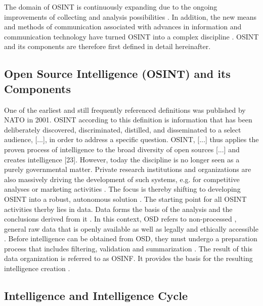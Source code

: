 \documentclass[10pt]{article}
\begin{document}
The domain of OSINT is continuously expanding due to the ongoing improvements of
collecting and analysis possibilities \cite{AlKilani.2021, Ghioni.2023, Williams.2018}. In
addition, the new means and methods of communication associated with advances in information
and communication technology have turned OSINT into a complex discipline
\cite{AlKilani.2021, Benes.2013, Chen.2012, Williams.2018}. OSINT and its
components are therefore first defined in detail hereinafter.

\subsection{Open Source Intelligence (OSINT) and its Components}

One of the earliest and still frequently referenced definitions \cite{DosPassos.2017}
was published by NATO in 2001. OSINT according to this definition is information that has been
deliberately discovered, discriminated, distilled, and disseminated to a select audience,
[...], in order to address a specific question. OSINT, [...] thus applies the proven
process of intelligence to the broad diversity of open sources [...] and creates
intelligence [23]. However, today the discipline is no longer seen as a purely governmental
matter. Private research institutions and organizations \cite{Bohm.2021,Mercado.2005} are
also massively driving the development of such systems, e.g. for competitive analyses or marketing activities
\cite{AlKilani.2021, Dokman.2020,Ghioni.2023}. The focus is thereby shifting to
developing OSINT into a robust, autonomous solution \cite{Billings.1997,PastorGalindo.2019,Schaurer.2010}.
The starting point for all OSINT activities therby lies in data. Data forms the basis of the
analysis and the conclusions derived from it \cite{Gibson.2016}. In this context, OSD
refers to non-processed \cite{DosPassos.2017}, general raw data that is openly available
\cite{Burke.2007} as well as legally and ethically accessible
\cite{Schaurer.2010, NorthAtlanticTreatyOrganization.2001}. Before intelligence can be obtained
from OSD, they must undergo a preparation process that includes filtering, validation and
summarization \cite{DosPassos.2017, NorthAtlanticTreatyOrganization.2001}. The result of this
data organization \cite{Schaurer.2010} is referred to as OSINF. It provides the basis for the
resulting intelligence creation \cite{DosPassos.2017,Schaurer.2010}.

\subsection{Intelligence and Intelligence Cycle}
\end{document}
